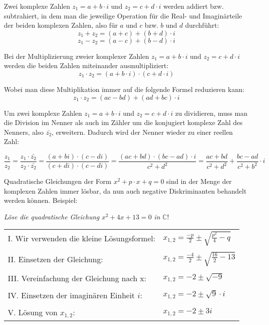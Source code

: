 Zwei komplexe Zahlen $z_{1} = a + b \cdot i$ und $z_{2} = c + d \cdot i$ werden addiert bzw. subtrahiert, in dem man die jeweilige Operation f\"{u}r die Real- und Imagin\"{a}rteile der beiden komplexen Zahlen, also f\"{u}r $a$ und $c$ bzw. $b$ und $d$ durchf\"{u}hrt: $$ z_{1} + z_{2} = (a + c) + (b + d) \cdot i$$ $$ z_{1} - z_{2} = (a - c) + (b - d) \cdot i$$


Bei der Multiplizierung zweier komplexer Zahlen $z_{1} = a + b \cdot i$ und $z_{2} = c + d \cdot i$ werden die beiden Zahlen miteinander ausmultipliziert: $$z_{1} \cdot z_{2} = (a + b \cdot i) \cdot (c + d \cdot i)$$

Wobei man diese Multiplikation immer auf die folgende Formel reduzieren kann: $$z_{1} \cdot z_{2} = (ac - bd) + (ad + bc) \cdot i$$

\pagebreak


Um zwei komplexe Zahlen $z_{1} = a + b \cdot i$ und $z_{2} = c + d \cdot i$ zu dividieren, muss man die Division im Nenner als auch im Z\"{a}hler um die konjugiert komplexe Zahl des Nenners, also $\bar{z_{2}}$, erweitern. Dadurch wird der Nenner wieder zu einer reellen Zahl: 

$$ 
\frac{z_{1}}{z_{2}} = \frac{z_{1} \cdot \bar{z_{2}}}{z_{2} \cdot \bar{z_{2}}} = \frac{(a + bi) \cdot (c - di)}{(c + di) \cdot (c - di)}
= \frac{(ac + bd) \cdot (bc - ad) \cdot i}{c^2 + d^2}
= \frac{ac + bd}{c^2 + d^2} + \frac{bc -ad}{c^2 + b^2} \cdot i
$$


Quadratische Gleichungen der Form $x^2 + p \cdot x + q = 0$ sind in der Menge der komplexen Zahlen immer l\"{o}sbar, da nun auch negative Diskriminanten behandelt werden k\"{o}nnen. Beispiel:

\emph{L\"{o}se die quadratische Gleichung $x^2 + 4x + 13 = 0$ in $\mathbb{C}$}!

\begin{tabular}{l l}
	I. Wir verwenden die kleine L\"{o}sungsformel: & $x_{1,2} = \frac{-p}{2} \pm \sqrt{\frac{p^2}{4} - q}$
	\\ & \\
	II. Einsetzen der Gleichung: & $x_{1,2} = \frac{-4}{2} \pm \sqrt{\frac{16}{2} - 13}$
	\\ & \\
	III. Vereinfachung der Gleichung nach x: & $x_{1,2} = -2 \pm \sqrt{-9}$
	\\ & \\
	IV. Einsetzen der imagin\"{a}ren Einheit $i$: & $x_{1,2} = -2 \pm \sqrt{9} \cdot i$
	\\ & \\
	V. L\"{o}sung von $x_{1, 2}$: & $x_{1, 2} = -2 \pm 3i$
\end{tabular}

